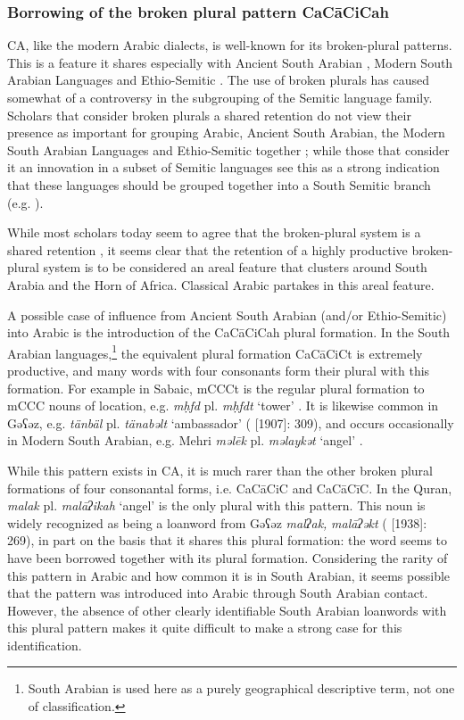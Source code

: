 \documentclass[output=paper]{langsci/langscibook}
\begin{document}
\subsubsection{\label{bkm:Ref13224664}Borrowing of the broken plural pattern CaCāCiCah}

CA, like the modern Arabic dialects, is well-known for its broken-plural patterns. This is a feature it shares especially with Ancient South Arabian \citep[1050--1051]{Stein2011}, Modern South Arabian Languages \citep[1085]{Simeone-Senelle2011} and Ethio-Semitic \citep[1132]{Weninger2011OldEth}. The use of broken plurals has caused somewhat of a controversy in the subgrouping of the Semitic language family. Scholars that consider broken plurals a shared retention do not view their presence as important for grouping Arabic, Ancient South Arabian, the Modern South Arabian Languages and Ethio-Semitic together \citep[159--160]{Huehnergard2005}; while those that consider it an innovation in a subset of Semitic languages see this as a strong indication that these languages should be grouped together into a South Semitic branch (e.g. \citealt{Ratcliffe1998}).

While most scholars today seem to agree that the broken-plural system is a shared retention \citep[1116]{Weninger2011GenEth}, it seems clear that the retention of a highly productive broken-plural system is to be considered an areal feature that clusters around South Arabia and the Horn of Africa. Classical Arabic partakes in this areal feature.

A possible case of influence from Ancient South Arabian (and/or Ethio-Semitic) into Arabic is the introduction of the CaCāCiCah plural formation. In the South Arabian languages,\footnote{South Arabian is used here as a purely geographical descriptive term, not one of classification.} the equivalent plural formation CaCāCiCt is extremely productive, and many words with four consonants form their plural with this formation. For example in Sabaic, mCCCt is the regular plural formation to mCCC nouns  of location, e.g. \textit{mḥfd} pl. \textit{mḥfdt} ‘tower’ \citep[34]{Beeston1962}. It is likewise common in Gəʕəz, e.g. \textit{tänbäl} pl. \textit{tänabəlt} ‘ambassador’ (\citealt{Dillmann2005} [1907]: 309), and occurs occasionally in Modern South Arabian, e.g. Mehri \textit{məlēk} pl. \textit{məlaykət} ‘angel’ \citep[68]{Rubin2010}.

While this pattern exists in CA, it is much rarer than the other broken plural formations of four consonantal forms, i.e. CaCāCiC and CaCāCīC. In the Quran, \textit{malak} pl. \textit{malāʔikah} ‘angel’ is the only plural with this pattern. This noun is widely recognized as being a loanword from Gəʕəz \textit{malʔak,} \textit{malāʔəkt} (\citealt{Jeffrey2007} [1938]: 269), in part on the basis that it shares this plural formation: the word seems to have been borrowed together with its plural formation. Considering the rarity of this pattern in Arabic and how common it is in South Arabian, it seems possible that the pattern was introduced into Arabic through South Arabian contact. However, the absence of other clearly identifiable South Arabian loanwords with this plural pattern makes it quite difficult to make a strong case for this identification.
\end{document}
